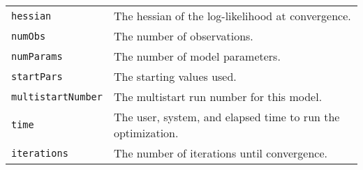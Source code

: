 \documentclass[article]{jss}
\begin{document}
\begin{longtable}[]{@{}ll@{}}
\begin{minipage}[t]{0.21\columnwidth}\raggedright
\texttt{hessian}\strut
\end{minipage} & \begin{minipage}[t]{0.73\columnwidth}\raggedright
The hessian of the log-likelihood at convergence.\strut
\end{minipage}\tabularnewline
\begin{minipage}[t]{0.21\columnwidth}\raggedright
\texttt{numObs}\strut
\end{minipage} & \begin{minipage}[t]{0.73\columnwidth}\raggedright
The number of observations.\strut
\end{minipage}\tabularnewline
\begin{minipage}[t]{0.21\columnwidth}\raggedright
\texttt{numParams}\strut
\end{minipage} & \begin{minipage}[t]{0.73\columnwidth}\raggedright
The number of model parameters.\strut
\end{minipage}\tabularnewline
\begin{minipage}[t]{0.21\columnwidth}\raggedright
\texttt{startPars}\strut
\end{minipage} & \begin{minipage}[t]{0.73\columnwidth}\raggedright
The starting values used.\strut
\end{minipage}\tabularnewline
\begin{minipage}[t]{0.21\columnwidth}\raggedright
\texttt{multistartNumber}\strut
\end{minipage} & \begin{minipage}[t]{0.73\columnwidth}\raggedright
The multistart run number for this model.\strut
\end{minipage}\tabularnewline
\begin{minipage}[t]{0.21\columnwidth}\raggedright
\texttt{time}\strut
\end{minipage} & \begin{minipage}[t]{0.73\columnwidth}\raggedright
The user, system, and elapsed time to run the optimization.\strut
\end{minipage}\tabularnewline
\begin{minipage}[t]{0.21\columnwidth}\raggedright
\texttt{iterations}\strut
\end{minipage} & \begin{minipage}[t]{0.73\columnwidth}\raggedright
The number of iterations until convergence.\strut
\end{minipage}\tabularnewline

\end{longtable}
\end{document}
